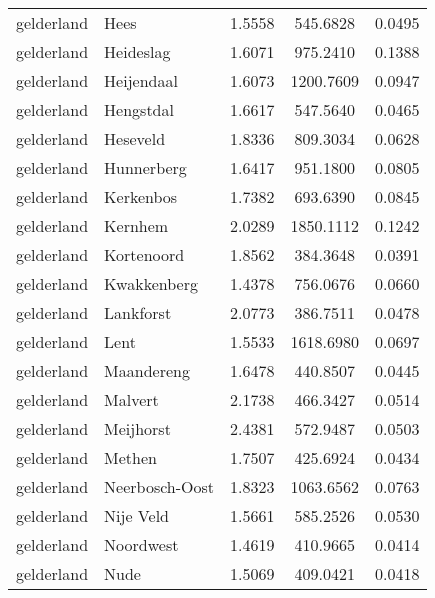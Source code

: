 \begin{longtable}{llccc}
	gelderland    & Hees                             & 1.5558  & 545.6828  & 0.0495          \\
	gelderland    & Heideslag                        & 1.6071  & 975.2410  & 0.1388          \\
	gelderland    & Heijendaal                       & 1.6073  & 1200.7609 & 0.0947          \\
	gelderland    & Hengstdal                        & 1.6617  & 547.5640  & 0.0465          \\
	gelderland    & Heseveld                         & 1.8336  & 809.3034  & 0.0628          \\
	gelderland    & Hunnerberg                       & 1.6417  & 951.1800  & 0.0805          \\
	gelderland    & Kerkenbos                        & 1.7382  & 693.6390  & 0.0845          \\
	gelderland    & Kernhem                          & 2.0289  & 1850.1112 & 0.1242          \\
	gelderland    & Kortenoord                       & 1.8562  & 384.3648  & 0.0391          \\
	gelderland    & Kwakkenberg                      & 1.4378  & 756.0676  & 0.0660          \\
	gelderland    & Lankforst                        & 2.0773  & 386.7511  & 0.0478          \\
	gelderland    & Lent                             & 1.5533  & 1618.6980 & 0.0697          \\
	gelderland    & Maandereng                       & 1.6478  & 440.8507  & 0.0445          \\
	gelderland    & Malvert                          & 2.1738  & 466.3427  & 0.0514          \\
	gelderland    & Meijhorst                        & 2.4381  & 572.9487  & 0.0503          \\
	gelderland    & Methen                           & 1.7507  & 425.6924  & 0.0434          \\
	gelderland    & Neerbosch-Oost                   & 1.8323  & 1063.6562 & 0.0763          \\
	gelderland    & Nije Veld                        & 1.5661  & 585.2526  & 0.0530          \\
	gelderland    & Noordwest                        & 1.4619  & 410.9665  & 0.0414          \\
	gelderland    & Nude                             & 1.5069  & 409.0421  & 0.0418          \\

\end{longtable}
